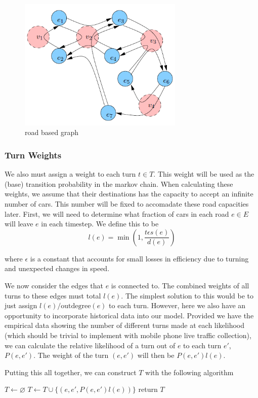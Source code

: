 \documentclass[a4paper]{article}
\newcommand\ddfrac[2]{\frac{\displaystyle #1}{\displaystyle #2}}
\begin{document}
\begin{figure}[h]
    \centering
    \includegraphics[width=0.7\textwidth]{road.PNG}
    \caption{road based graph}
    \label{fig:roa}
\end{figure}

\subsubsection{Turn Weights}
We also must assign a weight to each turn $t \in T$. 
This weight will be used as the (base) transition probability in the markov chain. 
When calculating these weights, we assume that their destinations has the capacity to accept an infinite number of cars. 
This number will be fixed to accomadate these road capacities later.
First, we will need to determine what fraction of cars in each road $e \in E$ will leave $e$ in each timestep. 
We define this to be
$$
l(e) = \min \left(1, \ddfrac{t \epsilon s(e)}{d(e)} \right)
$$

where $\epsilon$ is a constant that accounts for small losses in efficiency due to turning and unexpected changes in speed.

We now consider the edges that $e$ is connected to. The combined weights of all turns to these edges must total $l(e)$.
The simplest solution to this would be to just assign $l(e)/\mathrm{outdegree}(e)$ to each turn.
However, here we also have an opportunity to incorporate historical data into our model.
Provided we have the empirical data showing the number of different turns made at each likelihood 
(which should be trivial to implement with mobile phone live traffic collection), we can calculate the relative likelihood of a turn out of $e$ to each turn $e'$, $P(e, e')$.
The weight of the turn $(e, e')$ will then be $P(e, e') l(e)$.

Putting this all together, we can construct $T$ with the following algorithm
\begin{algorithmic}[1]
		\State $T \gets \varnothing$
					\State $T \gets T \cup \{(e, e', P(e, e') l(e))\}$
				\EndFor
			\EndFor
		\EndFor
		\State return $T$
	\EndFunction
\end{algorithmic}
\end{document}
